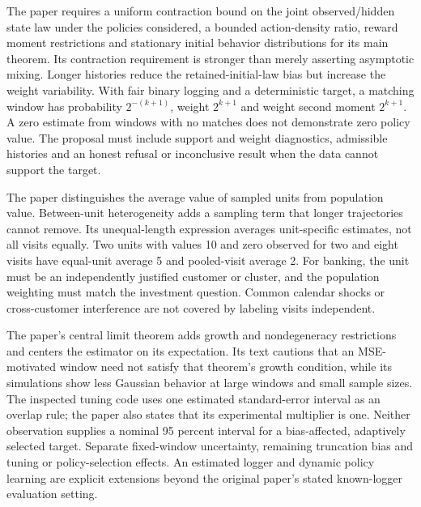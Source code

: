 The paper requires a uniform contraction bound on the joint observed/hidden
state law under the policies considered, a bounded action-density ratio,
reward moment restrictions and stationary initial behavior distributions
for its main theorem. Its contraction requirement is stronger than merely
asserting asymptotic mixing. Longer histories reduce the retained-initial-law
bias but increase the weight variability. With fair binary logging and a
deterministic target, a matching window has probability $2^{-(k+1)}$, weight
$2^{k+1}$ and weight second moment $2^{k+1}$. A zero estimate from windows
with no matches does not demonstrate zero policy value. The proposal must
include support and weight diagnostics, admissible histories and an honest
refusal or inconclusive result when the data cannot support the target.
\citep{exec24_policyother_original,exec24_policyother_contract}

The paper distinguishes the average value of sampled units from population
value. Between-unit heterogeneity adds a sampling term that longer trajectories
cannot remove. Its unequal-length expression averages unit-specific estimates,
not all visits equally. Two units with values 10 and zero observed for two and
eight visits have equal-unit average 5 and pooled-visit average 2. For banking,
the unit must be an independently justified customer or cluster, and the
population weighting must match the investment question. Common calendar shocks
or cross-customer interference are not covered by labeling visits independent.
\citep{exec24_policyother_original,exec24_policyother_contract}

The paper's central limit theorem adds growth and nondegeneracy restrictions
and centers the estimator on its expectation. Its text cautions that an
MSE-motivated window need not satisfy that theorem's growth condition, while
its simulations show less Gaussian behavior at large windows and small sample
sizes. The inspected tuning code uses one estimated standard-error interval
as an overlap rule; the paper also states that its experimental multiplier is
one. Neither observation supplies a nominal 95 percent interval for a
bias-affected, adaptively selected target. Separate fixed-window uncertainty,
remaining truncation bias and tuning or policy-selection effects. An estimated
logger and dynamic policy learning are explicit extensions beyond the original
paper's stated known-logger evaluation setting.
\citep{exec24_policyother_original,exec24_policyother_ope}

